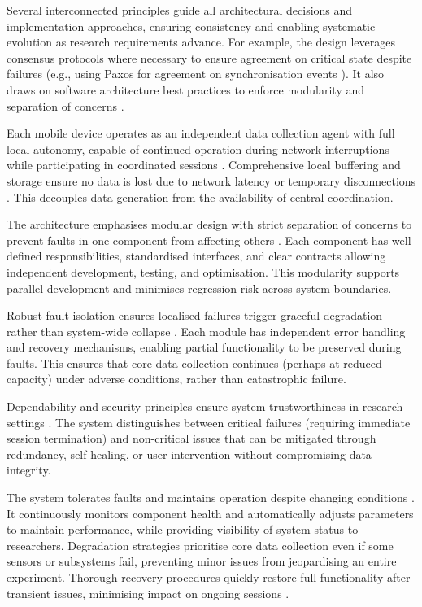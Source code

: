 \documentclass[11pt,a4paper]{report}
\begin{document}
Several interconnected principles guide all architectural decisions and implementation approaches, ensuring consistency and enabling systematic evolution as research requirements advance. For example, the design leverages consensus protocols where necessary to ensure agreement on critical state despite failures (e.g., using Paxos for agreement on synchronisation events \cite{Lamport2001}). It also draws on software architecture best practices to enforce modularity and separation of concerns \cite{Bass2012}.

Each mobile device operates as an independent data collection agent with full local autonomy, capable of continued operation during network interruptions while participating in coordinated sessions \cite{Fischer1985}. Comprehensive local buffering and storage ensure no data is lost due to network latency or temporary disconnections \cite{Chandra1996}. This decouples data generation from the availability of central coordination.

The architecture emphasises modular design with strict separation of concerns to prevent faults in one component from affecting others \cite{Parnas1972}. Each component has well-defined responsibilities, standardised interfaces, and clear contracts allowing independent development, testing, and optimisation. This modularity supports parallel development and minimises regression risk across system boundaries.

Robust fault isolation ensures localised failures trigger graceful degradation rather than system-wide collapse \cite{Garlan1993}. Each module has independent error handling and recovery mechanisms, enabling partial functionality to be preserved during faults. This ensures that core data collection continues (perhaps at reduced capacity) under adverse conditions, rather than catastrophic failure.

Dependability and security principles ensure system trustworthiness in research settings \cite{Avizienis2004}. The system distinguishes between critical failures (requiring immediate session termination) and non-critical issues that can be mitigated through redundancy, self-healing, or user intervention without compromising data integrity. 

The system tolerates faults and maintains operation despite changing conditions \cite{Jalote1994}. It continuously monitors component health and automatically adjusts parameters to maintain performance, while providing visibility of system status to researchers. Degradation strategies prioritise core data collection even if some sensors or subsystems fail, preventing minor issues from jeopardising an entire experiment. Thorough recovery procedures quickly restore full functionality after transient issues, minimising impact on ongoing sessions \cite{Lee1990}.
\end{document}
